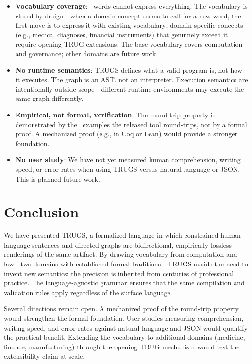 \documentclass{article}
\begin{document}
\begin{itemize}
    \item \textbf{Vocabulary coverage}: \VocabTotal\ words cannot express everything. The vocabulary is closed by design---when a domain concept seems to call for a new word, the first move is to express it with existing vocabulary; domain-specific concepts (e.g., medical diagnoses, financial instruments) that genuinely exceed it require opening TRUG extensions. The base vocabulary covers computation and governance; other domains are future work.

    \item \textbf{No runtime semantics}: TRUGS defines what a valid program is, not how it executes. The graph is an AST, not an interpreter. Execution semantics are intentionally outside scope---different runtime environments may execute the same graph differently.

    \item \textbf{Empirical, not formal, verification}: The round-trip property is demonstrated by the \ExamplesRoundTrip\ examples the released tool round-trips, not by a formal proof. A mechanized proof (e.g., in Coq or Lean) would provide a stronger foundation.

    \item \textbf{No user study}: We have not yet measured human comprehension, writing speed, or error rates when using TRUGS versus natural language or JSON. This is planned future work.
\end{itemize}

\section{Conclusion}

We have presented TRUGS, a formalized language in which constrained human-language sentences and directed graphs are bidirectional, empirically lossless renderings of the same artifact. By drawing vocabulary from computation and law---two domains with established formal traditions---TRUGS avoids the need to invent new semantics: the precision is inherited from centuries of professional practice. The language-agnostic grammar ensures that the same compilation and validation rules apply regardless of the surface language.

Several directions remain open. A mechanized proof of the round-trip property would strengthen the formal foundation. User studies measuring comprehension, writing speed, and error rates against natural language and JSON would quantify the practical benefit. Extending the vocabulary to additional domains (medicine, finance, manufacturing) through the opening TRUG mechanism would test the extensibility claim at scale.
\end{document}
